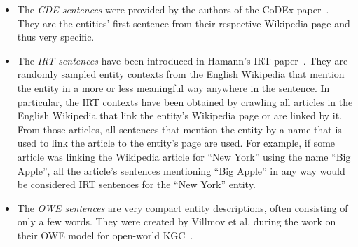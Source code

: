 \begin{itemize}
    \item The \emph{CDE sentences} were provided by the authors of the CoDEx paper~\cite{Safavi2020CoDExAC}. They are the entities' first sentence from their respective Wikipedia page and thus very specific.

    \item The \emph{IRT sentences} have been introduced in Hamann's IRT paper~\cite{IRT}. They are randomly sampled entity contexts from the English Wikipedia that mention the entity in a more or less meaningful way anywhere in the sentence. In particular, the IRT contexts have been obtained by crawling all articles in the English Wikipedia that link the entity's Wikipedia page or are linked by it. From those articles, all sentences that mention the entity by a name that is used to link the article to the entity's page are used. For example, if some article was linking the Wikipedia article for ``New York'' using the name ``Big Apple'', all the article's sentences mentioning ``Big Apple'' in any way would be considered IRT sentences for the ``New York'' entity.

    \item The \emph{OWE sentences} are very compact entity descriptions, often consisting of only a few words. They were created by Villmov et al. during the work on their OWE model for open-world KGC~\cite{Shah2019AnOE}.
\end{itemize}
